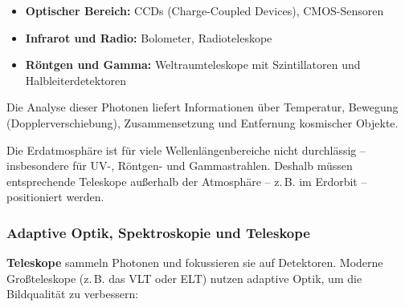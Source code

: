 \begin{itemize}
	\item \textbf{Optischer Bereich:} CCDs (Charge-Coupled Devices), CMOS-Sensoren
	\item \textbf{Infrarot und Radio:} Bolometer, Radioteleskope
	\item \textbf{Röntgen und Gamma:} Weltraumteleskope mit Szintillatoren und Halbleiterdetektoren
\end{itemize}

Die Analyse dieser Photonen liefert Informationen über Temperatur, Bewegung (Dopplerverschiebung), Zusammensetzung und Entfernung kosmischer Objekte.

\medskip
\begin{tcolorbox}[physikbox, title=Warum kommen manche Photonen nicht auf der Erde an?] 
	\label{box:photonen auf erde}
	\small
	Die Erdatmosphäre ist für viele Wellenlängenbereiche nicht durchlässig – insbesondere für UV-, Röntgen- und Gammastrahlen. Deshalb müssen entsprechende Teleskope außerhalb der Atmosphäre – z.\,B. im Erdorbit – positioniert werden.
\end{tcolorbox}

\subsubsection{Adaptive Optik, Spektroskopie und Teleskope}

\textbf{Teleskope} sammeln Photonen und fokussieren sie auf Detektoren. Moderne Großteleskope (z.\,B. das VLT oder ELT) nutzen adaptive Optik, um die Bildqualität zu verbessern:

